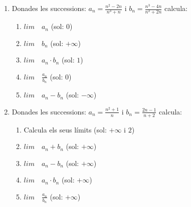 \documentclass{article}
\begin{document}
\begin{enumerate}
\item Donades les successions: $a_n=\frac{n^2-2n}{n^3+n}$ i $b_n=\frac{n^3-4n}{n^2+2n}$ calcula:

\begin{enumerate}
	\item $lim \quad a_n$ (sol: $0$)
	\item $lim \quad b_n$ (sol: $+\infty$)
	\item $lim \quad a_n\cdot b_n$ (sol: $1$)
	\item $lim \quad \frac{a_n}{b_n}$ (sol: $0$)
	\item $lim \quad a_n-b_n$ (sol: $-\infty$)
\end{enumerate}

\item Donades les successions: $a_n=\frac{n^2+1}{n}$ i $b_n=\frac{2n-1}{n+2}$ calcula:

\begin{enumerate}
	\item Calcula els seus límits (sol: $+\infty$ i $2$)
	\item $lim \quad a_n+b_n$ (sol: $+\infty$)
	\item $lim \quad a_n-b_n$ (sol: $+\infty$)
	\item $lim \quad a_n\cdot b_n$ (sol: $+\infty$)
	\item $lim \quad \frac{a_n}{b_n}$ (sol: $+\infty$)
\end{enumerate}


\end{enumerate}
\end{document}
